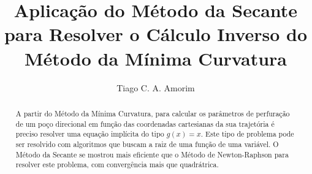 \documentclass[final,5p]{elsarticle}
\numberwithin{equation}{section}
\begin{document}
\begin{frontmatter}



\title{Aplicação do Método da Secante para Resolver o Cálculo Inverso do Método da Mínima Curvatura}


\author{Tiago C. A. Amorim}

\begin{abstract}

    A partir do Método da Mínima Curvatura, para calcular os parâmetros de perfuração de um poço direcional em função das coordenadas cartesianas da sua trajetória é preciso resolver uma equação implícita do tipo $g(x)=x$. Este tipo de problema pode ser resolvido com algoritmos que buscam a raiz de uma função de uma variável. O Método da Secante se mostrou mais eficiente que o Método de Newton-Raphson para resolver este problema, com convergência mais que quadrátrica.


\end{abstract}
\end{frontmatter}
\end{document}
